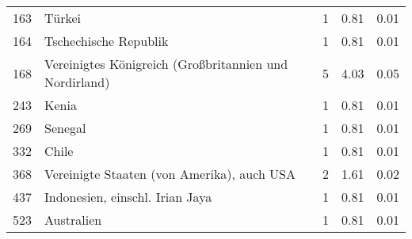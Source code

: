 \begin{longtable}{lXrrr}
        163 & \multicolumn{1}{X}{Türkei} & %
          \num{1} &
          \num[round-mode=places,round-precision=2]{0.81} &
          \num[round-mode=places,round-precision=2]{0.01} \\

        164 & \multicolumn{1}{X}{Tschechische Republik} & %
          \num{1} &
          \num[round-mode=places,round-precision=2]{0.81} &
          \num[round-mode=places,round-precision=2]{0.01} \\

        168 & \multicolumn{1}{X}{Vereinigtes Königreich (Großbritannien und Nordirland)} & %
          \num{5} &
          \num[round-mode=places,round-precision=2]{4.03} &
          \num[round-mode=places,round-precision=2]{0.05} \\

        243 & \multicolumn{1}{X}{Kenia} & %
          \num{1} &
          \num[round-mode=places,round-precision=2]{0.81} &
          \num[round-mode=places,round-precision=2]{0.01} \\

        269 & \multicolumn{1}{X}{Senegal} & %
          \num{1} &
          \num[round-mode=places,round-precision=2]{0.81} &
          \num[round-mode=places,round-precision=2]{0.01} \\

        332 & \multicolumn{1}{X}{Chile} & %
          \num{1} &
          \num[round-mode=places,round-precision=2]{0.81} &
          \num[round-mode=places,round-precision=2]{0.01} \\

        368 & \multicolumn{1}{X}{Vereinigte Staaten (von Amerika), auch USA} & %
          \num{2} &
          \num[round-mode=places,round-precision=2]{1.61} &
          \num[round-mode=places,round-precision=2]{0.02} \\

        437 & \multicolumn{1}{X}{Indonesien, einschl. Irian Jaya} & %
          \num{1} &
          \num[round-mode=places,round-precision=2]{0.81} &
          \num[round-mode=places,round-precision=2]{0.01} \\

        523 & \multicolumn{1}{X}{Australien} & %
          \num{1} &
          \num[round-mode=places,round-precision=2]{0.81} &
          \num[round-mode=places,round-precision=2]{0.01} \\


\end{longtable}
